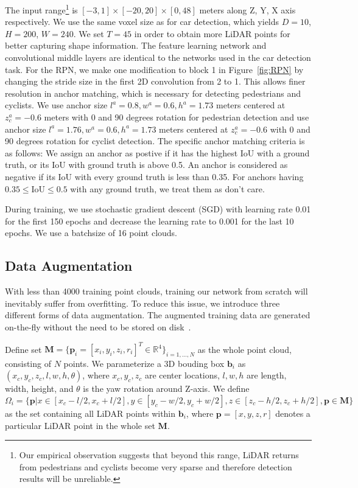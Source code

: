 \documentclass[10pt,twocolumn,letterpaper]{article}
\begin{document}
 The input range\footnote{Our empirical observation suggests that beyond this range, LiDAR returns from pedestrians and cyclists become very sparse and therefore detection results will be unreliable.} is $[-3, 1] \times [-20, 20] \times [0, 48]$ meters along Z, Y, X axis respectively. We use the same voxel size as for car detection, which yields $D=10$, $H=200$, $W=240$. We set $T=45$ in order to obtain more LiDAR points for better capturing shape information. The feature learning network and convolutional middle layers are identical to the networks used in the car detection task. For the RPN, we make one modification to block 1 in Figure~\ref{fig:RPN} by changing the stride size in the first 2D convolution from 2 to 1. This allows finer resolution in anchor matching, which is necessary for detecting pedestrians and cyclists. We use anchor size $l^a=0.8, w^a=0.6, h^a=1.73$ meters  centered at $z_c^a = -0.6$ meters with 0 and 90 degrees rotation for pedestrian detection and use anchor size $l^a=1.76, w^a=0.6, h^a=1.73$ meters centered at $z_c^a = -0.6$ with 0 and 90 degrees rotation for cyclist detection.
The specific anchor matching criteria is as follows: We assign an anchor as postive if it has the highest IoU with a ground truth, or its IoU with ground truth is above 0.5. An anchor is considered as negative if its IoU with every ground truth is less than 0.35. For anchors having $0.35 \leq \textrm{IoU} \leq 0.5$ with any ground truth, we treat them as don't care. 


During training, we use stochastic gradient descent (SGD) with learning rate 0.01 for the first 150 epochs and decrease the learning rate to 0.001 for the last 10 epochs. We use a batchsize of 16 point clouds.



\subsection{Data Augmentation}
With less than 4000 training point clouds, training our network from scratch will inevitably suffer from overfitting. To reduce this issue, we introduce three different forms of data augmentation. The augmented training data are generated on-the-fly without the need to be stored on disk~\cite{REF:NIPS2012_4824}. 


Define set $\mathbf{M} = \{ \mathbf{p}_i=[x_i, y_i, z_i, r_i]^T \in \mathbb{R}^4 \}_{i=1, \ldots, N}$ as the whole point cloud, consisting of $N$ points.
We parameterize a  3D bouding box $\mathbf{b}_i$ as $(x_c, y_c, z_c, l, w, h, \theta)$, where $x_c, y_c, z_c$ are center locations, $l, w, h$ are length, width, height, and $\theta$ is the yaw rotation around Z-axis. We define $\Omega_i=\{\mathbf{p} | x \in [x_c - l/2, x_c + l/2], y \in [y_c - w/2, y_c + w/2], z \in [z_c - h/2, z_c + h/2], \mathbf{p} \in \mathbf{M}\}$ as the set containing all LiDAR points within $\mathbf{b}_i$, where $\mathbf{p}=[x, y, z, r]$ denotes a particular LiDAR point in the whole set $\mathbf{M}$.
\end{document}
